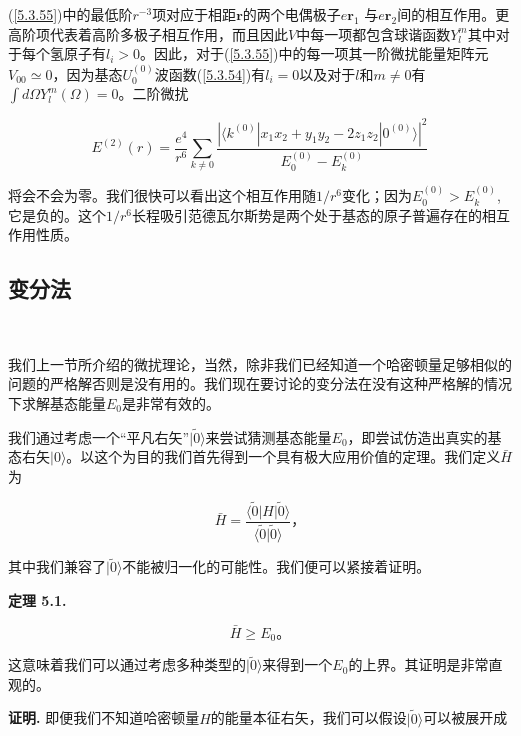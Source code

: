 ﻿\documentclass[UTF8,twoside]{ctexart}
\begin{document}
\noindent (\ref{5.3.55})中的最低阶$r^{-3}$项对应于相距$\boldsymbol{r}$的两个电偶极子$e\boldsymbol{r}_1$ 与$e\boldsymbol{r}_2$间的相互作用。更高阶项代表着高阶多极子相互作用，而且因此$V$中每一项都包含球谐函数$Y_l^m$其中对于每个氢原子有$l_i>0$。因此，对于(\ref{5.3.55})中的每一项其一阶微扰能量矩阵元$V_{00}\simeq0$，因为基态$U_0^{(0)}$波函数(\ref{5.3.54})有$l_i=0$以及对于$l$和$m\neq0$有$\int d\Omega Y_l^m(\Omega)=0$。二阶微扰

\begin{equation} \label{5.3.56}
E^{(2)}(r)=\dfrac{e^4}{r^6}\displaystyle\sum_{k\neq0}\dfrac{|\langle k^{(0)}|x_1x_2+y_1y_2-2z_1z_2| 0^{(0)}\rangle|^2}{E_0^{(0)}-E_k^{(0)}}
\end{equation}

\noindent 将会不会为零。我们很快可以看出这个相互作用随$1/r^6$变化；因为$E_0^{(0)}>E_k^{(0)}$,它是负的。这个$1/r^6$长程吸引范德瓦尔斯势是两个处于基态的原子普遍存在的相互作用性质。

\subsection{变分法}

\

\noindent 我们上一节所介绍的微扰理论，当然，除非我们已经知道一个哈密顿量足够相似的问题的严格解否则是没有用的。我们现在要讨论的变分法在没有这种严格解的情况下求解基态能量$E_0$是非常有效的。

\noindent 我们通过考虑一个“平凡右矢”$|\tilde{0}\rangle$来尝试猜测基态能量$E_0$，即尝试仿造出真实的基态右矢$|0\rangle$。以这个为目的我们首先得到一个具有极大应用价值的定理。我们定义$\bar{H}$为

\begin{equation} \label{5.4.1}
\bar{H}=\dfrac{\langle\tilde{0}|H|\tilde{0}\rangle}{\langle\tilde{0}|\tilde{0}\rangle}\text{，}
\end{equation}

\noindent 其中我们兼容了$|\tilde{0}\rangle$不能被归一化的可能性。我们便可以紧接着证明。


\noindent \textbf{定理 5.1.}

\begin{equation} \label{5.4.2}
\bar{H}\geq E_0\text{。}
\end{equation}

\noindent 这意味着我们可以通过考虑多种类型的$|\tilde{0}\rangle$来得到一个$E_0$的上界。其证明是非常直观的。

\noindent \textbf{证明.} 即便我们不知道哈密顿量$H$的能量本征右矢，我们可以假设$|\tilde{0}\rangle$可以被展开成
\end{document}
